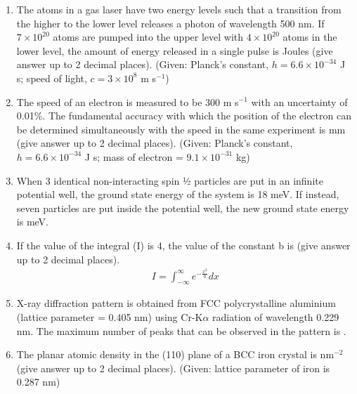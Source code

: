 \documentclass[a4paper,10pt]{article}
\begin{document}
\begin{enumerate}
    \item The atoms in a gas laser have two energy levels such that a transition from the higher to the lower level releases a photon of wavelength 500 nm. If $7 \times 10^{20}$ atoms are pumped into the upper level with $4 \times 10^{20}$ atoms in the lower level, the amount of energy released in a single pulse is \underline{\hspace{2cm}} Joules (give answer up to 2 decimal places).
    (Given: Planck's constant, $h = 6.6 \times 10^{-34}$ J s; speed of light, $c = 3 \times 10^8$ m s$^{-1}$)
    \hfill{}

    \item The speed of an electron is measured to be 300 m s$^{-1}$ with an uncertainty of 0.01\%. The fundamental accuracy with which the position of the electron can be determined simultaneously with the speed in the same experiment is \underline{\hspace{2cm}} mm (give answer up to 2 decimal places).
    (Given: Planck's constant, $h = 6.6 \times 10^{-34}$ J s; mass of electron = $9.1 \times 10^{-31}$ kg)
    \hfill{}

    \item When 3 identical non-interacting spin ½ particles are put in an infinite potential well, the ground state energy of the system is 18 meV. If instead, seven particles are put inside the potential well, the new ground state energy is \underline{\hspace{2cm}} meV.
    \hfill{}

    \item If the value of the integral (I) is 4, the value of the constant b is \underline{\hspace{2cm}} (give answer up to 2 decimal places).
    \begin{align*}
        I = \int_{-\infty}^{\infty} e^{-\frac{x^2}{b}} dx
    \end{align*}
    \hfill{}

    \item X-ray diffraction pattern is obtained from FCC polycrystalline aluminium (lattice parameter = 0.405 nm) using Cr-K$\alpha$ radiation of wavelength 0.229 nm. The maximum number of peaks that can be observed in the pattern is \underline{\hspace{2cm}}.
    \hfill{}

    \item The planar atomic density in the (110) plane of a BCC iron crystal is \underline{\hspace{2cm}} nm$^{-2}$ (give answer up to 2 decimal places).
    (Given: lattice parameter of iron is 0.287 nm)
    \hfill{}


\end{enumerate}
\end{document}
